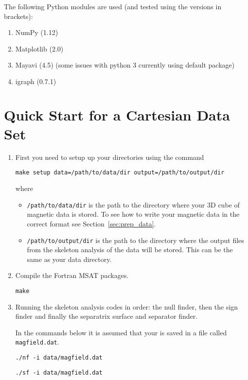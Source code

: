 \documentclass[12pt]{article}
\begin{document}
    The following Python modules are used (and tested using the versions in brackets):
    \begin{enumerate}
      \item NumPy (1.12)
      \item Matplotlib (2.0)
      \item Mayavi (4.5) (some issues with python 3 currently using default package)
      \item igraph (0.7.1)
    \end{enumerate}

  \section{Quick Start for a Cartesian Data Set}

    \begin{enumerate}
      \item First you need to setup up your directories using the command
      
      \texttt{make setup data=/path/to/data/dir output=/path/to/output/dir}
      
      where
      \begin{itemize}
        \item \texttt{/path/to/data/dir} is the path to the directory where your 3D cube of magnetic data is stored. To see how to write your magnetic data in the correct format see Section~\ref{sec:prep_data}. 

        \item \texttt{/path/to/output/dir} is the path to the directory where the output files from the skeleton analysis of the data will be stored. This can be the same as your data directory.
      \end{itemize}

      \item Compile the Fortran MSAT packages.

      \texttt{make}

      \item Running the skeleton analysis codes in order: the null finder, then the sign finder and finally the separatrix surface and separator finder.

      In the commands below it is assumed that your is saved in a file called \texttt{magfield.dat}.

      \texttt{./nf -i data/magfield.dat}

      \texttt{./sf -i data/magfield.dat}


\end{enumerate}
\end{document}
